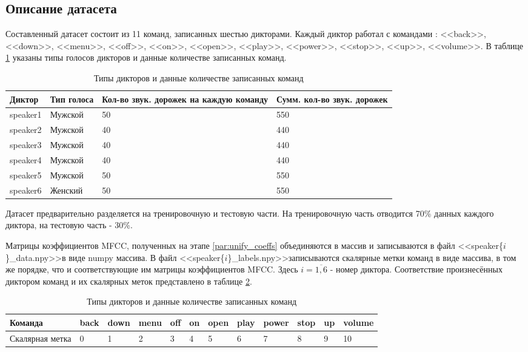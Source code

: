 \subsection{Описание датасета}
Составленный датасет состоит из 11 команд, записанных шестью дикторами. Каждый диктор работал с командами : <<back>>, <<down>>, <<menu>>, <<off>>, <<on>>, <<open>>, <<play>>, <<power>>, <<stop>>, <<up>>, <<volume>>. В таблице \ref{table:dataset} указаны типы голосов дикторов и данные количестве записанных команд.
\begin{table}[H]
\begin{tabular}[c]{ | p{1.8cm} | p{2.5cm} | p{6cm} | p{4cm} | }
	\hline
	Диктор & Тип голоса & Кол-во звук. дорожек на каждую команду & Сумм. кол-во звук. дорожек  \\ \hline
	speaker1 & Мужской & 50 & 550 \\
	speaker2 & Мужской & 40 & 440 \\
	speaker3 & Мужской & 40 & 440 \\
	speaker4 & Мужской & 40 & 440 \\
	speaker5 & Мужской & 50 & 550 \\
	speaker6 & Женский & 50 & 550 \\ \hline
	
\end{tabular}
\caption{\label{table:dataset}Типы дикторов и данные количестве записанных команд}
\end{table}

Датасет предварительно разделяется на тренировочную и тестовую части. На тренировочную часть отводится 70\% данных каждого диктора, на тестовую часть - 30\%.

\label{par:saving_preprocessed_data}
Матрицы коэффициентов MFCC, полученных на этапе \ref{par:unify_coeffs} объединяются в массив и записываются в файл <<speaker\{$i$\}\_data.npy>>\footnotemark[\value{footnote}] \space в виде numpy массива. В файл <<speaker\{$i$\}\_labels.npy>>\footnotemark[\value{footnote}] записываются скалярные метки команд в виде массива, в том же порядке, что и соответствующие им матрицы коэффициентов MFCC. Здесь $i=\overline{1,6}$  - номер диктора. Соответствие произнесённых диктором команд и их скалярных меток представлено в таблице \ref{table:commands}.


\begin{table}[H]
	\small
	\begin{tabular}[c]{ | l | l | l | l | l | l | l | l | l | l | l | l |}
		\hline
		Команда	 &  back & down & menu & off & on & open & play & power & stop & up & volume \\ \hline
		Скалярная метка & 0 & 1 & 2 & 3 & 4 & 5 & 6 & 7 & 8 & 9 & 10 \\ \hline
		
	\end{tabular}
	\caption{\label{table:commands}Типы дикторов и данные количестве записанных команд}
\end{table}